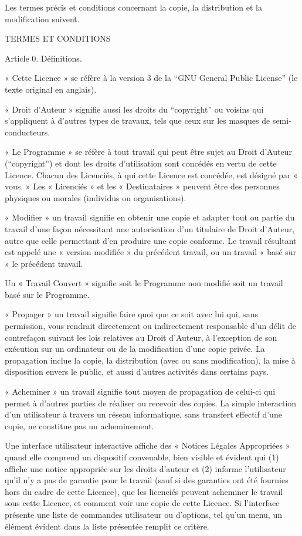 {  Les termes précis et conditions concernant la copie, la distribution
et la modification suivent.

\begin{center}
TERMES ET CONDITIONS
\end{center}

Article 0. Définitions.

« Cette Licence » se réfère à la version 3 de la “GNU General Public
License” (le texte original en anglais).

« Droit d’Auteur » signifie aussi les droits du “copyright” ou voisins
qui s’appliquent à d’autres types de travaux, tels que ceux sur les
masques de semi-conducteurs.

« Le Programme » se réfère à tout travail qui peut être sujet au Droit
d’Auteur (“copyright”) et dont les droits d’utilisation sont concédés
en vertu de cette Licence. Chacun des Licenciés, à qui cette Licence
est concédée, est désigné par « vous. » Les « Licenciés » et les
« Destinataires » peuvent être des personnes physiques ou morales
(individus ou organisations).

« Modifier » un travail signifie en obtenir une copie et adapter tout
ou partie du travail d’une façon nécessitant une autorisation d’un
titulaire de Droit d’Auteur, autre que celle permettant d’en produire
une copie conforme. Le travail résultant est appelé une « version
modifiée » du précédent travail, ou un travail « basé sur » le
précédent travail.

Un « Travail Couvert » signifie soit le Programme non modifié soit un
travail basé sur le Programme.

« Propager » un travail signifie faire quoi que ce soit avec lui qui,
sans permission, vous rendrait directement ou indirectement responsable
d’un délit de contrefaçon suivant les lois relatives au Droit d’Auteur,
à l’exception de son exécution sur un ordinateur ou de la modification
d’une copie privée. La propagation inclue la copie, la distribution
(avec ou sans modification), la mise à disposition envers le public, et
aussi d'autres activités dans certains pays.

« Acheminer » un travail signifie tout moyen de propagation de celui-ci
qui permet à d’autres parties de réaliser ou recevoir des copies. La
simple interaction d’un utilisateur à travers un réseau informatique,
sans transfert effectif d’une copie, ne constitue pas un acheminement.

Une interface utilisateur interactive affiche des « Notices Légales
Appropriées » quand elle comprend un dispositif convenable, bien
visible et évident qui (1) affiche une notice appropriée sur les droits
d’auteur et (2) informe l’utilisateur qu’il n’y a pas de garantie pour
le travail (sauf si des garanties ont été fournies hors du cadre de
cette Licence), que les licenciés peuvent acheminer le travail sous
cette Licence, et comment voir une copie de cette Licence. Si
l’interface présente une liste de commandes utilisateur ou d’options,
tel qu’un menu, un élément évident dans la liste présentée remplit ce
critère.


}
